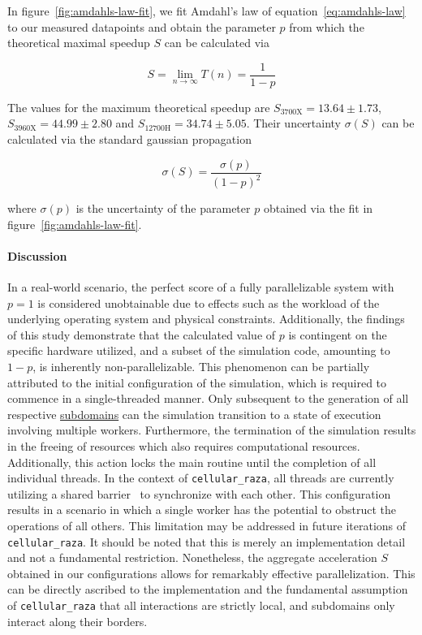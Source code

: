 In figure~\ref{fig:amdahls-law-fit}, we fit Amdahl's law of equation~\ref{eq:amdahls-law} to our
measured datapoints and obtain the parameter $p$ from which the theoretical maximal speedup $S$ can
be calculated via

\begin{equation}
    S = \lim\limits_{n\rightarrow\infty} T(n) = \frac{1}{1-p}
    \label{eq:amdahls-law-maximum-speedup}
\end{equation}

The values for the maximum theoretical speedup are $S_\text{3700X}=13.64\pm1.73$,
$S_\text{3960X}=44.99\pm2.80$ and $S_\text{12700H}=34.74\pm5.05$.
Their uncertainty $\sigma(S)$ can be calculated via the standard gaussian propagation

\begin{equation}
    \sigma(S) = \frac{\sigma(p)}{(1-p)^2}
\end{equation}

where $\sigma(p)$ is the uncertainty of the parameter $p$ obtained via the fit in
figure~\ref{fig:amdahls-law-fit}.

\paragraph{Discussion}
In a real-world scenario, the perfect score of a fully parallelizable system with $p=1$ is
considered unobtainable due to effects such as the workload of the underlying operating system and
physical constraints.
Additionally, the findings of this study demonstrate that the calculated value of $p$ is contingent
on the specific hardware utilized, and a subset of the simulation code, amounting to $1-p$, is
inherently non-parallelizable.
This phenomenon can be partially attributed to the initial configuration of the simulation, which is
required to commence in a single-threaded manner.
Only subsequent to the generation of all respective
\href{https://cellular-raza.com/docs/cellular_raza_core/backend/chili/struct.SubDomainBox.html}
{subdomains} can the simulation transition to a state of execution involving multiple workers.
Furthermore, the termination of the simulation results in the freeing of resources which also
requires computational resources.
Additionally, this action locks the main routine until the completion of all individual threads.
In the context of \texttt{cellular\_raza}, all threads are currently utilizing a shared
barrier~\cite{GjengsetHurdles2018} to synchronize with each other.
This configuration results in a scenario in which a single worker has the potential to obstruct the
operations of all others.
This limitation may be addressed in future iterations of \texttt{cellular\_raza}.
It should be noted that this is merely an implementation detail and not a fundamental restriction.
Nonetheless, the aggregate acceleration $S$ obtained in our configurations allows for remarkably
effective parallelization.
This can be directly ascribed to the implementation and the fundamental assumption of
\texttt{cellular\_raza} that all interactions are strictly local, and subdomains only interact along
their borders.

